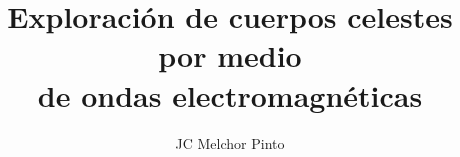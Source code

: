 \documentclass[12pt,addpoints,answers]{guia}
\title{Exploración de cuerpos celestes por medio \\ de ondas electromagnéticas}
\author{JC Melchor Pinto}
\begin{document}
\INFO%
\begin{questions}
    \questionboxed[25]{}
    \questionboxed[25]{}
\end{questions}
\end{document}
